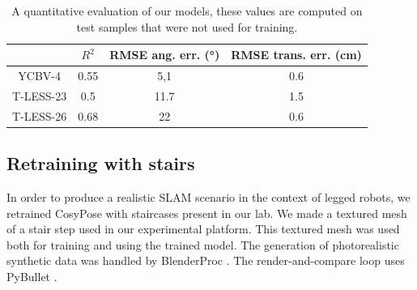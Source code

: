 \begin{table}[h]
    \centering
    \caption{A quantitative evaluation of our models, these values are computed on test samples that were not used for training. }
    \begin{tabular}{|c|c|c|c|}
        \hline 
          & $\displaystyle R^{2}$ & RMSE ang. err. (°) & RMSE trans. err. (cm) \\
        \hline 
         YCBV-4 & 0.55 & 5,1 & 0.6 \\
        \hline 
         T-LESS-23 & 0.5 & 11.7 & 1.5 \\
        \hline 
         T-LESS-26 & 0.68 & 22 & 0.6 \\
         \hline
    \end{tabular}
    \label{tab:empirical_models}
\end{table}



\subsection{Retraining with stairs}
\label{sec:retraining_with_stairs}
In order to produce a realistic SLAM scenario in the context of legged robots, we retrained CosyPose with staircases present in our lab.
We made a textured mesh of a stair step used in our experimental platform. This textured mesh was used both for training and using the trained model. 
The generation of photorealistic synthetic data was handled by BlenderProc \cite{denninger2019blenderproc}. The render-and-compare loop uses PyBullet \cite{coumans2021}.

